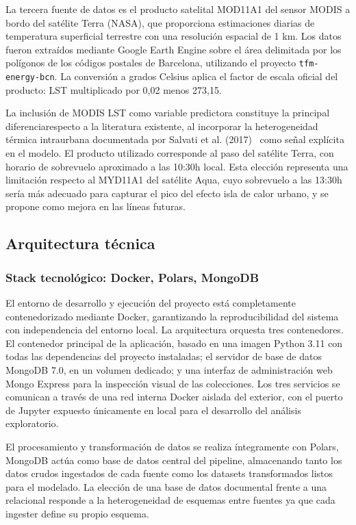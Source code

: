 \documentclass[12pt, a4paper]{article}
\begin{document}
La tercera fuente de datos es el producto satelital MOD11A1 del sensor MODIS a bordo del satélite Terra (NASA), que proporciona estimaciones diarias de temperatura superficial terrestre con una resolución espacial de 1 km. Los datos fueron extraídos mediante Google Earth Engine sobre el área delimitada por los polígonos de los códigos postales de Barcelona, utilizando el proyecto \texttt{tfm-energy-bcn}. La conversión a grados Celsius aplica el factor de escala oficial del producto: LST multiplicado por 0,02 menos 273,15.

La inclusión de MODIS LST como variable predictora constituye la principal diferenciarespecto a la literatura existente, al incorporar la heterogeneidad térmica intraurbana documentada por Salvati et al. (2017)~\cite{salvati2017} como señal explícita en el modelo. El producto utilizado corresponde al paso del satélite Terra, con horario de sobrevuelo aproximado a las 10:30h local. Esta elección representa una limitación respecto al  MYD11A1 del satélite Aqua, cuyo sobrevuelo a las 13:30h sería más adecuado para capturar el pico del efecto isla de calor urbano, y se propone como mejora en las líneas futuras.

\subsection{Arquitectura técnica}

\subsubsection{Stack tecnológico: Docker, Polars, MongoDB}

El entorno de desarrollo y ejecución del proyecto está completamente contenedorizado mediante Docker, garantizando la reproducibilidad del sistema con independencia del entorno local. La arquitectura orquesta tres contenedores. El contenedor principal de la aplicación, basado en una imagen Python 3.11 con todas las dependencias del proyecto instaladas; el servidor de base de datos MongoDB 7.0,  en un volumen dedicado; y una interfaz de administración web Mongo Express para la inspección visual de las colecciones. Los tres servicios se comunican a través de una red interna Docker aislada del exterior, con el puerto de Jupyter expuesto únicamente en local para el desarrollo del análisis exploratorio.

El procesamiento y transformación de datos se realiza íntegramente con Polars,  MongoDB actúa como base de datos central del pipeline, almacenando tanto los datos crudos ingestados de cada fuente como los datasets transformados listos para el modelado. La elección de una base de datos documental frente a una relacional responde a la heterogeneidad de esquemas entre fuentes ya que cada ingester define su propio esquema.
\end{document}

